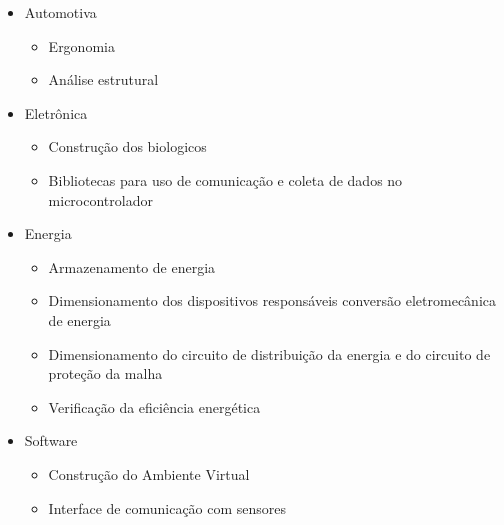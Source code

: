 \begin{itemize}
	\item Automotiva
		\begin{itemize}
		\item Ergonomia
		\item Análise estrutural
		\end{itemize}
	\item Eletrônica
		\begin{itemize}
		\item Construção dos biologicos
		\item Bibliotecas para uso de comunicação e coleta de dados no microcontrolador
		\end{itemize}
	\item Energia
		\begin{itemize}
		\item Armazenamento de energia
		\item Dimensionamento dos dispositivos responsáveis conversão eletromecânica de energia
		\item Dimensionamento do circuito de distribuição da energia e do circuito de proteção da malha
		\item Verificação da eficiência energética
		\end{itemize}
	\item Software
		\begin{itemize}
		\item Construção do Ambiente Virtual
		\item Interface de comunicação com sensores
		\end{itemize}
\end{itemize}
